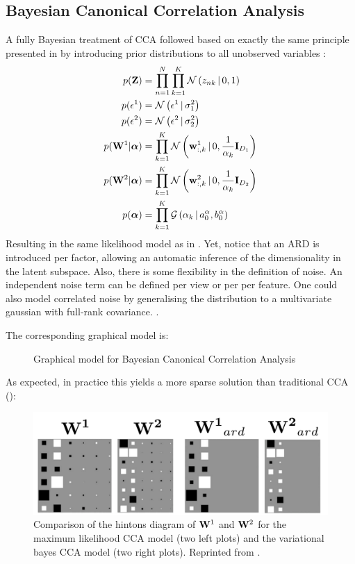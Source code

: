 \subsection{Bayesian Canonical Correlation Analysis} \label{section:bayesian_cca}
A fully Bayesian treatment of CCA followed based on exactly the same principle presented in  by introducing prior distributions to all unobserved variables \cite{Wang2007,Klami2013}:
\begin{align*} 
	p({\bf Z}) &= \prod_{n=1}^{N} \prod_{k=1}^{K} \mathcal{N}\left(z_{nk} \,|\, 0,1\right) \\
	p(\epsilon^{1}) &= \mathcal{N}\left(\epsilon^{1} \,|\, \sigma_{1}^{2}\right) \\
	p(\epsilon^{2}) &= \mathcal{N}\left(\epsilon^{2} \,|\, \sigma_{2}^{2}\right) \\
	p({\bf W}^1|\mbox{\boldmath $\alpha$}) &= \prod_{k=1}^{K} \mathcal{N}\left({\bf w}^{1}_{:,k} \,|\, 0,\frac{1}{\alpha_{k}}{\bf I}_{D_1}\right) \\
	p({\bf W}^2|\mbox{\boldmath $\alpha$}) &= \prod_{k=1}^{K} \mathcal{N}\left({\bf w}^{2}_{:,k} \,|\, 0,\frac{1}{\alpha_{k}}{\bf I}_{D_2}\right) \\
	p(\mbox{\boldmath $\alpha$}) &= \prod_{k=1}^{K} \mathcal{G}\left(\alpha_k \,|\, a_0^\alpha, b_0^\alpha\right)
\end{align*}
Resulting in the same likelihood model as in . Yet, notice that an ARD is introduced per factor, allowing an automatic inference of the dimensionality in the latent subspace.
Also, there is some flexibility in the definition of noise. An independent noise term can be defined per view or per per feature. One could also model correlated noise by generalising the distribution to a multivariate gaussian with full-rank covariance. \cite{Wang2007,Klami2013}.

The corresponding graphical model is:

\begin{figure}[H] \begin{center}
	
	\label{fig:graphical_bayesianCCA}
	\caption{Graphical model for Bayesian Canonical Correlation Analysis}
\end{center} \end{figure}

As expected, in practice this yields a more sparse solution than traditional CCA ():

\begin{figure}[H]
	\centering
	\includegraphics[width=0.85\linewidth]{hinton_cca}
	\caption{Comparison of the hintons diagram of ${\bf W}^{1}$ and ${\bf W}^{2}$ for the maximum likelihood CCA model (two left plots) and the variational bayes CCA model (two right plots). Reprinted from \cite{Wang2007}.}
	\label{fig:hinton_cca}
\end{figure}


